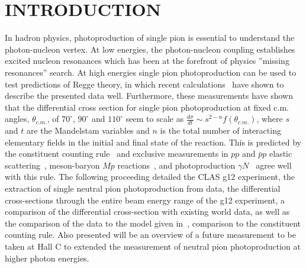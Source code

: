 \documentclass{aip-cp}
\begin{document}
\section{INTRODUCTION}
In hadron physics, photoproduction of single pion is essential to understand the photon-nucleon vertex. At low energies, the photon-nucleon coupling establishes excited nucleon resonances which has been at the forefront of physics ''missing resonances'' search. At high energies single pion photoproduction can be used to test predictions of Regge theory, in which recent calculations~\cite{JPAC} have shown to describe the presented data well. Furthermore, these measurements have shown that the differential cross section for single pion photoproduction at fixed c.m. angles, $\theta_{c.m.}$, of $70^{\circ}$, $90^{\circ}$ and $110^{\circ}$ seem to scale as $\frac{d\sigma}{dt} \sim s^{2-n}f(\theta_{c.m.})$, where $s$ and $t$ are the Mandelstam variables and $n$ is the total number of interacting elementary fields in the initial and final state of the reaction. This is predicted by the constituent counting rule~\cite{scaling1,scaling2} and exclusive measurements in $pp$ and  $\bar{p}p$ elastic scattering~\cite{scalingexp5, scalingexp7}, meson-baryon $M p$ reactions~\cite{scalingexp7}, and photoproduction $\gamma N$~\cite{scalingexp2, scalingexp3, scalingexp4, scalingexp6, scalingexp8, scalingexp9, scalingexp10, scalingexp11} agree well with this rule. The following proceeding detailed the CLAS g12 experiment, the extraction of single neutral pion photoproduction from data, the differential cross-sections through the entire beam energy range of the g12 experiment, a comparison of the differential cross-section with existing world data, as well as the comparison of the data to the model given in~\cite{JPAC}, comparison to the constituent counting rule. Also presented will be an overview of a future measurement to be taken at Hall C to extended the measurement of neutral pion photoproduction at higher photon energies.
\end{document}
